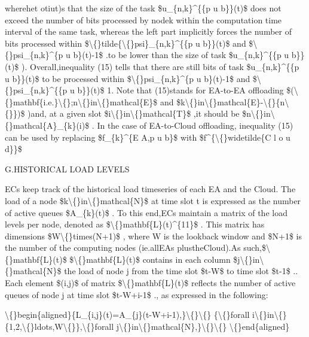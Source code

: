 \documentclass{article}
\begin{document}
wherehet otiut)s that the size of the task \$u\_\{n,k\}\textasciicircum{}\{\{p u b\}\}(t)\$ does not exceed the number of bits processed by nodek within the computation time interval of the same task, whereas the left part implicitly forces the number of bits processed within \$\textbackslash\{\}tilde\{\textbackslash\{\}psi\}\_\{n,k\}\textasciicircum{}\{\{p u b\}\}(t)\$ and \$\textbackslash\{\}psi\_\{n,k\}\textasciicircum{}\{p u b\}(t)-1\$ .to be lower than the size of task \$u\_\{n,k\}\textasciicircum{}\{\{p u b\}\}(t)\$ ). Overall,inequality (15) tells that there are still bits of task \$u\_\{n,k\}\textasciicircum{}\{\{p u b\}\}(t)\$ to be processed within \$\textbackslash\{\}psi\_\{n,k\}\textasciicircum{}\{p u b\}(t)-1\$ and \$\textbackslash\{\}psi\_\{n,k\}\textasciicircum{}\{\{p u b\}\}(t)\$ 1. Note that (15)stands for EA-to-EA offloading \$(\textbackslash\{\}mathbf\{i.e.\}\textbackslash\{\};n\textbackslash\{\}in\textbackslash\{\}mathcal\{E\}\$ and \$k\textbackslash\{\}in\textbackslash\{\}mathcal\{E\}-\textbackslash\{\}\{n\textbackslash\{\}\})\$ )and, at a given slot \$i\textbackslash\{\}in\textbackslash\{\}mathcal\{T\}\$ ,it should be \$n\textbackslash\{\}in\textbackslash\{\}mathcal\{A\}\_\{k\}(i)\$ . In the case of EA-to-Cloud offloading, inequality (15) can be used by replacing \$f\_\{k\}\textasciicircum{}\{E A,p u b\}\$ with \$f\textasciicircum{}\{\textbackslash\{\}widetilde\{C l o u d\}\}\$

G.HISTORICAL LOAD LEVELS

ECs keep track of the historical load timeseries of each EA and the Cloud. The load of a node \$k\textbackslash\{\}in\textbackslash\{\}mathcal\{N\}\$ at time slot t is expressed as the number of active queues \$A\_\{k\}(t)\$ . To this end,ECs maintain a matrix of the load levels per node, denoted as \$\textbackslash\{\}mathbf\{L\}(t)\textasciicircum{}\{11\}\$ . This matrix has dimensions \$W\textbackslash\{\}times(N+1)\$ , where W is the lookback window and \$N+1\$ is the number of the computing nodes (ie.allEAs plustheCloud).As such,\$\textbackslash\{\}mathbf\{L\}(t)\$ \$\textbackslash\{\}mathbf\{L\}(t)\$ contains in each column \$j\textbackslash\{\}in\textbackslash\{\}mathcal\{N\}\$ the load of node j from the time slot \$t-W\$ to time slot \$t-1\$ .. Each element \$(i,j)\$ of matrix \$\textbackslash\{\}mathbf\{L\}(t)\$ reflects the number of active queues of node j at time slot \$t-W+i-1\$ ., as expressed in the following:

\textbackslash\{\}begin\{aligned\}\{L\_\{i,j\}(t)=A\_\{j\}(t-W+i-1),\}\textbackslash\{\}\textbackslash\{\} \{\textbackslash\{\}forall i\textbackslash\{\}in\textbackslash\{\}\{1,2,\textbackslash\{\}ldots,W\textbackslash\{\}\},\textbackslash\{\}forall j\textbackslash\{\}in\textbackslash\{\}mathcal\{N\},\}\textbackslash\{\}\textbackslash\{\} \textbackslash\{\}end\{aligned\}
\end{document}
